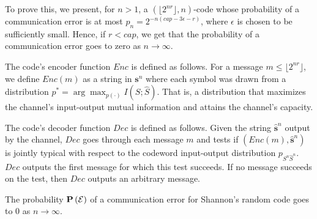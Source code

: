 To prove this, we present, for $n > 1$, a $(\lfloor 2^{nr}\rfloor, n)$-code whose probability of a communication error is at most $p_n = 2^{-n\left(\mathit{cap} - 3\epsilon - r\right)}$, where $\epsilon$ is chosen to be sufficiently small. Hence, if $r < \mathit{cap}$, we get that the probability of a communication error goes to zero as $n \to \infty$.

The code's encoder function $\mathit{Enc}$ is defined as follows. For a message $m \leq \lfloor 2^{nr}\rfloor$, we define $\mathit{Enc}(m)$ as a string in $\mathbf{s}^n$ where each symbol was drawn from a distribution $p^* = \arg\max_{p(\cdot)} I(S; \hat{S})$. That is, a distribution that maximizes the channel's input-output mutual information and attains the channel's capacity.

The code's decoder function $\mathit{Dec}$ is defined as follows. Given the string $\hat{\mathbf{s}}^n$ output by the channel, $\mathit{Dec}$ goes through each message $m$ and tests if $(\mathit{Enc}(m), \hat{\mathbf{s}}^n)$ is jointly typical with respect to the codeword input-output distribution $p_{S^n\hat{S}^n}$. $\mathit{Dec}$ outputs the first message for which this test succeeds. If no message succeeds on the test, then $\mathit{Dec}$ outputs an arbitrary message.


\begin{theorem}
The probability $\mathbf{P}\left(\mathcal{E}\right)$ of a communication error for Shannon's random code goes to 0 as $n \to \infty$.
\label{thm:shannon_random_code}
\end{theorem}


